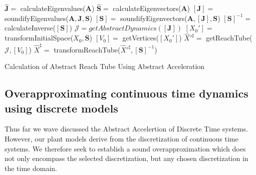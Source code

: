 \documentclass[twocolumn]{autart}    %
\newcommand{\mat}[1]{\boldsymbol{#1}}
\begin{document}
\begin{algorithm}[]
\small
\begin{algorithmic}[1]
\State $\hat{\mat{J}}=$ calculateEigenvalues($ \mat{A}$)
\label{alg:calcEigenvalues}
\State $\hat{\mat{S}}=$ calculateEigenvectors($ \mat{A}$)
\label{alg:calcEigenvectors}
\State $[\mat{J}]=$ soundifyEigenvalues($\mat{A},\mat{J},\mat{S}$)
\label{alg:soundEigenvalues}
\State $[\mat{S}]=$ soundifyEigenvectors($\mat{A},[\mat{J}],\mat{S}$)
\label{alg:soundEigenvectors}
\State $[\mat{S}]^{-1}=$ calculateInverse($[\mat{S}]$)
\label{alg:inverse}
\State $\mathcal{J}=getAbstractDynamics([\mat{J}])$
\label{alg:aa}
\State $[X_0']=$ transformInitialSpace($X_0,\mat{S}$)
\label{alg:eigeninit}
\State $[V_0]=$ getVertices($[X_0']$)
\label{alg:getVertices}
\State ${\hat{X}'^\sharp}=$ getReachTube($\mathcal{J},[V_0]$)
\label{alg:getReachTube}
\State ${\hat{X}^\sharp}=$ transformReachTube(${\hat{X}'^\sharp},[\mat{S}]^{-1}$)
\label{alg:getNormReachTube}
\EndFunction
\end{algorithmic}
\caption{Calculation of Abstract Reach Tube Using Abstract Acceleration}
\label{alg:findReachTube}
\end{algorithm}

\subsection{Overapproximating continuous time dynamics using discrete models}
\label{sec:cont_aa}

Thus far we wave discussed the Abstract Accelertion of Discrete Time
systems.  However, our plant models derive from the discretization of
continuous time systems.  We therefore seek to establish a sound
overapproximation which does not only encompass the selected discretization,
but any chosen discretization in the time domain.
\end{document}
